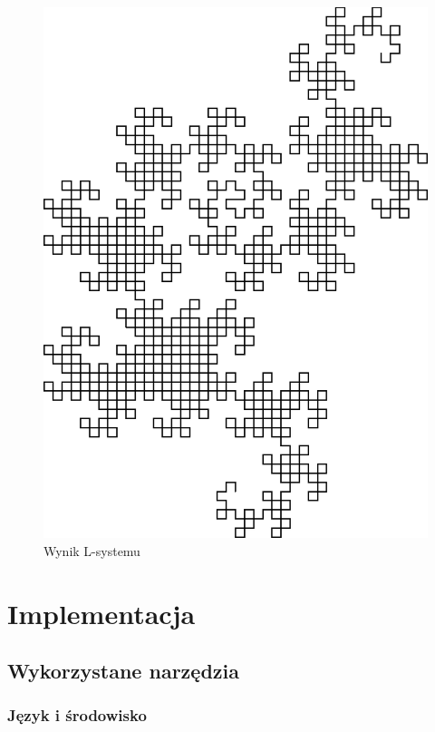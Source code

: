 \documentclass[a4paper,12pt,oneside]{book} %
\begin{document}
\begin{figure}[h]
	\centering
	\includegraphics[scale=0.7]{grafika/example10}
	\caption{Wynik L-systemu}
	\label{fig:dragoncurve}
\end{figure}

\chapter{Implementacja} 


\section{Wykorzystane narzędzia}

\subsection{Język i środowisko}
\end{document}
